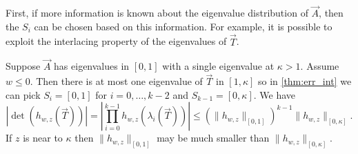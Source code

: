 First, if more information is known about the eigenvalue distribution of \( \vec{A} \), then the \( S_i \) can be chosen based on this information.
For example, it is possible to exploit the interlacing property of the eigenvalues of \( \vec{T} \).
\begin{example}
Suppose \( \vec{A} \) has eigenvalues in \( [0,1] \) with a single eigenvalue at \( \kappa > 1 \).  Assume \( w \leq 0 \).
Then there is at most one eigenvalue of \( \vec{T} \) in \( [1,\kappa] \) so in \cref{thm:err_int} we can pick $S_i = [0,1]$ for $i = 0,\ldots, k-2$ and $S_{k-1} = [0,\kappa]$. We have
\begin{equation*}
    |\!\det(h_{w,z}(\vec{T}))| = \left| \prod_{i=0}^{k-1} h_{w,z}(\lambda_i(\vec{T})) \right| \leq
      \left(\| h_{w,z} \|_{[0,1]}\right)^{k-1} \|h_{w,z}\|_{[0,\kappa]}.
\end{equation*}
If \( z \) is near to \( \kappa \) then \( \| h_{w,z} \|_{[0,1]} \) may be much smaller than \( \| h_{w,z} \|_{[0,\kappa]} \).
\end{example}

